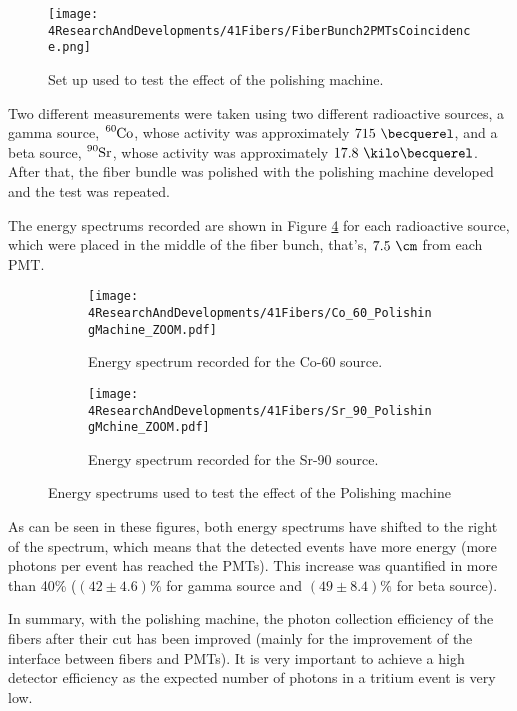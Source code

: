 \begin{figure}[]
\centering
\texttt{[image: 4ResearchAndDevelopments/41Fibers/FiberBunch2PMTsCoincidence.png]}
\caption{Set up used to test the effect of the polishing machine.\label{fig:BunchWith2PMTsCoincidence}}
\end{figure}

Two different measurements were taken using two different radioactive sources, a gamma source, $\ce{^{60}Co}$, whose activity was approximately $715~\becquerel$, and a beta source, $\ce{^{90}Sr}$, whose activity was approximately $17.8~\kilo\becquerel$. After that, the fiber bundle was polished with the polishing machine developed and the test was repeated.

The energy spectrums recorded are shown in Figure \ref{fig:ResultsOfPolishingMachine} for each radioactive source, which were placed in the middle of the fiber bunch, that's, $7.5~\cm$ from each PMT.

\begin{figure}
\centering
    \begin{subfigure}[b]{0.76\textwidth}
    \centering
    \texttt{[image: 4ResearchAndDevelopments/41Fibers/Co\_60\_PolishingMachine\_ZOOM.pdf]}  
    \caption{Energy spectrum recorded for the Co-60 source.\label{subfig:EnergySpectrumCo60PolishingTest}}
    \end{subfigure}
    \hfill
    \begin{subfigure}[b]{0.76\textwidth}
    \centering
    \texttt{[image: 4ResearchAndDevelopments/41Fibers/Sr\_90\_PolishingMchine\_ZOOM.pdf]}  
    \caption{Energy spectrum recorded for the Sr-90 source.\label{subfig:EnergySpectrumSr90PolishingTest}}
    \end{subfigure}
 \caption{Energy spectrums used to test the effect of the Polishing machine}
 \label{fig:ResultsOfPolishingMachine}
\end{figure}

As can be seen in these figures, both energy spectrums have shifted to the right of the spectrum, which means that the detected events have more energy (more photons per event has reached the PMTs). This increase was quantified in more than 40\% ($(42 \pm 4.6)\%$ for gamma source and $(49 \pm 8.4)\%$ for beta source).

In summary, with the polishing machine, the photon collection efficiency of the fibers after their cut has been improved  (mainly for the improvement of the interface between fibers and PMTs). It is very important to achieve a high detector efficiency as the expected number of photons in a tritium event is very low.